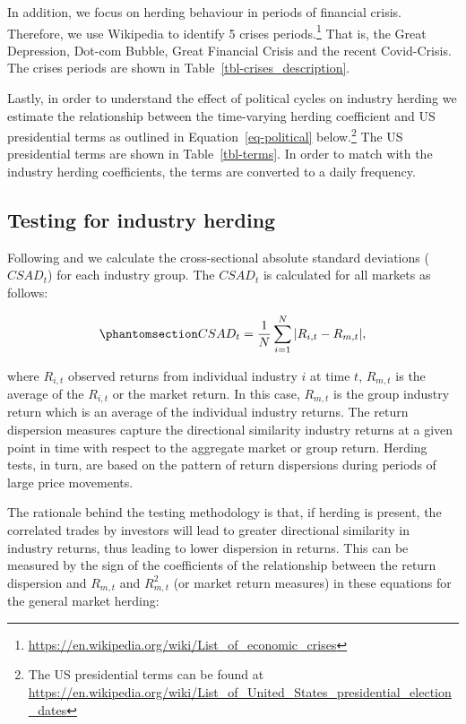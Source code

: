 \documentclass[
  letterpaper,
  DIV=11,
  numbers=noendperiod]{scrartcl}
\begin{document}
In addition, we focus on herding behaviour in periods of financial
crisis. Therefore, we use Wikipedia to identify 5 crises
periods.\footnote{\url{https://en.wikipedia.org/wiki/List_of_economic_crises}}
That is, the Great Depression, Dot-com Bubble, Great Financial Crisis
and the recent Covid-Crisis. The crises periods are shown in
Table~\ref{tbl-crises_description}.

Lastly, in order to understand the effect of political cycles on
industry herding we estimate the relationship between the time-varying
herding coefficient and US presidential terms as outlined in
Equation~\ref{eq-political} below.\footnote{The US presidential terms
  can be found at
  \url{https://en.wikipedia.org/wiki/List_of_United_States_presidential_election_dates}}
The US presidential terms are shown in Table~\ref{tbl-terms}. In order
to match with the industry herding coefficients, the terms are converted
to a daily frequency.

\subsection{Testing for industry
herding}\label{testing-for-industry-herding}

Following \citet{christie1995following} and \citet{chang2000examination}
we calculate the cross-sectional absolute standard deviations
(\(CSAD_{t}\)) for each industry group. The \(CSAD_{t}\) is calculated
for all markets as follows:

\begin{equation}\phantomsection\label{eq-csad}{CSAD_{t} = \frac{1}{N}\sum_{i =1}^{N}{|R_{i,t} - R_{m,t}|},}\end{equation}

where \(R_{i,t}\) observed returns from individual industry \(i\) at
time \(t\), \(R_{m,t}\) is the average of the \(R_{i,t}\) or the market
return. In this case, \(R_{m,t}\) is the group industry return which is
an average of the individual industry returns. The return dispersion
measures capture the directional similarity industry returns at a given
point in time with respect to the aggregate market or group return.
Herding tests, in turn, are based on the pattern of return dispersions
during periods of large price movements.

The rationale behind the testing methodology is that, if herding is
present, the correlated trades by investors will lead to greater
directional similarity in industry returns, thus leading to lower
dispersion in returns. This can be measured by the sign of the
coefficients of the relationship between the return dispersion and
\(R_{m, t}\) and \(R_{m, t}^2\) (or market return measures) in these
equations for the general market herding:
\end{document}
